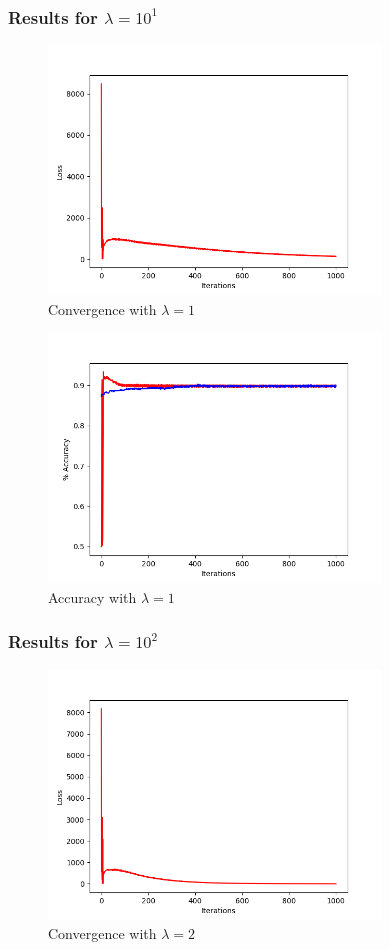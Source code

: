 \documentclass[letterpaper,10pt]{article}
\begin{document}
\subsubsection{Results for \(\lambda = 10^{1}\)}
     \begin{figure}[ht]
    \centering
   \includegraphics[width=250pt]{L2-pos1-convergence.png}
    \caption{Convergence with \(\lambda = 1\)}
    \label{fig:Convergence of loss function over iterations}
    \end{figure}

     \begin{figure}[ht]
    \centering
   \includegraphics[width=250pt]{L2-pos1-gradientLong.png}
     \caption{Accuracy with \(\lambda = 1\)}
    \label{fig:Plot of accuracy over iterations. Red is training data.}
    \end{figure}
\subsubsection{Results for \(\lambda = 10^{2}\)}
     \begin{figure}[ht]
    \centering
   \includegraphics[width=250pt]{L2-pos2-convergence.png}
    \caption{Convergence with \(\lambda = 2\)}
    \label{fig:Convergence of loss function over iterations}
    \end{figure}
\end{document}
